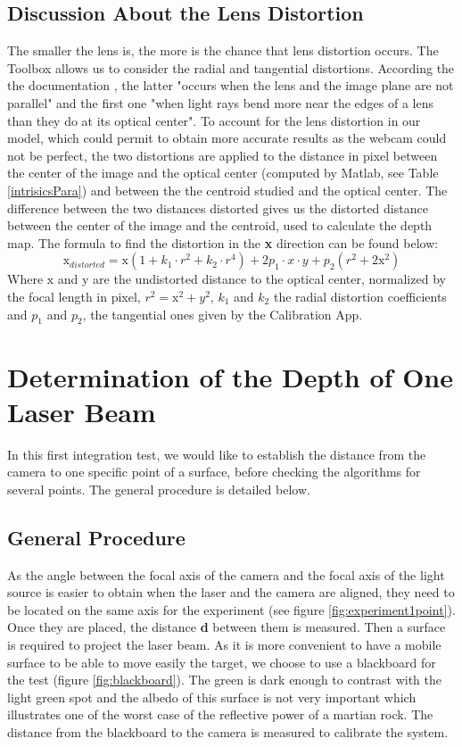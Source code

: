 \subsection{Discussion About the Lens Distortion}
The smaller the lens is, the more is the chance that lens distortion occurs. The Toolbox allows us to consider the radial and tangential distortions. According the the documentation \cite{matlabtoolbox}, the latter "occurs when the lens and the image plane are not parallel" and the first one "when light rays bend more near the edges of a lens than they do at its optical center". To account for the lens distortion in our model, which could permit to obtain more accurate results as the webcam could not be perfect, the two distortions are applied to the distance in pixel between the center of the image and the optical center (computed by Matlab, see Table \ref{intrisicsPara}) and between the the centroid studied and the optical center. The difference between the two distances distorted gives us the distorted distance between the center of the image and the centroid, used to calculate the depth map. The formula to find the distortion  in the \textbf{x} direction can be found below:
\begin{equation}
\text{x}_{distorted} = \text{x}(1 + k_1 \cdot r^2 + k_2 \cdot r^4) + 2p_1 \cdot x \cdot y + p_2(r^2 + 2\text{x}^2)
\end{equation}
Where $\text{x}$ and y are the undistorted distance to the optical center, normalized by the focal length in pixel, $r^2 = \text{x}^2 + y^2$, $k_1$ and $k_2$ the radial distortion coefficients and $p_1$ and $p_2$, the tangential ones given by the Calibration App.

\section{Determination of the Depth of One Laser Beam}
In this first integration test, we would like to establish the distance from the camera to one specific point of a surface, before checking the algorithms for several points. The general procedure is detailed below. 

\subsection{General Procedure}
As the angle between the focal axis of the camera and the focal axis of the light source is easier to obtain when the laser and the camera are aligned, they need to be located on the same axis for the experiment (see figure \ref{fig:experiment1point}). Once they are placed, the distance \textbf{d} between them is measured. Then a surface is required to project the laser beam. As it is more convenient to have a mobile surface to be able to move easily the target, we choose to use a blackboard for the test (figure \ref{fig:blackboard}). The green is dark enough to contrast with the light green spot and the albedo of this surface is not very important which illustrates one of the worst case of the reflective power of a martian rock. The distance from the blackboard to the camera is measured to calibrate the system.


